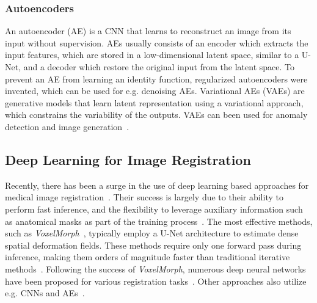 \subsubsection{Autoencoders} \label{SubSubSec:Autoencoders}
An autoencoder (AE) is a CNN that learns to reconstruct an image from its input without supervision. AEs usually consists of an encoder which extracts the input features, which are stored in a low-dimensional latent space, similar to a U-Net, and a decoder which restore the original input from the latent space. To prevent an AE from learning an identity function, regularized autoencoders were invented, which can be used for e.g. denoising AEs. Variational AEs (VAEs) are generative models that learn latent representation using a variational approach, which constrains the variability of the outputs. VAEs can been used for anomaly detection and image generation~\cite{Fu2020}.


\subsection{Deep Learning for Image Registration} \label{SubSec:DLImageRegistration}
Recently, there has been a surge in the use of deep learning based approaches for medical image registration~\cite{Chen2023}. Their success is largely due to their ability to perform fast inference, and the flexibility to leverage auxiliary information such as anatomical masks as part of the training process~\cite{Fu2020}. The most effective methods, such as \emph{VoxelMorph}~\cite{Voxelmorph}, typically employ a U-Net architecture to estimate dense spatial deformation fields. These methods require only one forward pass during inference, making them orders of magnitude faster than traditional iterative methods~\cite{Fu2020}. Following the success of \emph{VoxelMorph}, numerous deep neural networks have been proposed for various registration tasks~\cite{Fourier-Net+}. Other approaches also utilize e.g. CNNs and AEs~\cite{Chen2023}. 


